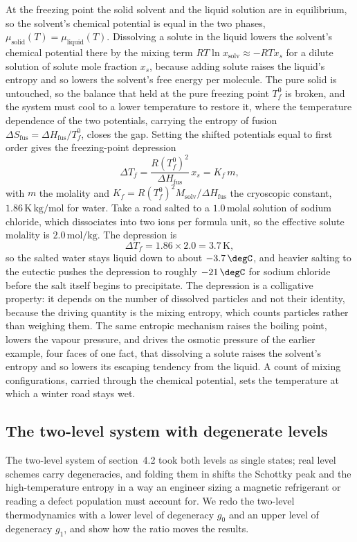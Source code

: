 At the freezing point the solid solvent and the liquid solution are in equilibrium,
so the solvent's chemical potential is equal in the two phases,
$\mu_{\text{solid}}(T) = \mu_{\text{liquid}}(T)$. Dissolving a solute in the liquid
lowers the solvent's chemical potential there by the mixing term $RT\ln x_{\text{solv}}
\approx -RT x_s$ for a dilute solution of solute mole fraction $x_s$, because adding
solute raises the liquid's entropy and so lowers the solvent's free energy per
molecule. The pure solid is untouched, so the balance that held at the pure freezing
point $T_f^0$ is broken, and the system must cool to a lower temperature to restore
it, where the temperature dependence of the two potentials, carrying the entropy of
fusion $\Delta S_{\text{fus}} = \Delta H_{\text{fus}}/T_f^0$, closes the gap.
Setting the shifted potentials equal to first order gives the freezing-point
depression
\[
\Delta T_f = \frac{R (T_f^0)^2}{\Delta H_{\text{fus}}}\,x_s
= K_f\, m,
\]
with $m$ the molality and $K_f = R(T_f^0)^2 M_{\text{solv}}/\Delta H_{\text{fus}}$
the cryoscopic constant, $1.86\,\si{\kelvin}\,\text{kg}/\text{mol}$ for water. Take
a road salted to a $1.0\,\text{molal}$ solution of sodium chloride, which
dissociates into two ions per formula unit, so the effective solute molality is
$2.0\,\text{mol}/\text{kg}$. The depression is
\[
\Delta T_f = 1.86 \times 2.0 = 3.7\,\si{\kelvin},
\]
so the salted water stays liquid down to about $-3.7\,\degC$, and heavier salting to
the eutectic pushes the depression to roughly $-21\,\degC$ for sodium chloride
before the salt itself begins to precipitate. The depression is a colligative
property: it depends on the number of dissolved particles and not their identity,
because the driving quantity is the mixing entropy, which counts particles rather
than weighing them. The same entropic mechanism raises the boiling point, lowers the
vapour pressure, and drives the osmotic pressure of the earlier example, four faces
of one fact, that dissolving a solute raises the solvent's entropy and so lowers its
escaping tendency from the liquid. A count of mixing configurations, carried through
the chemical potential, sets the temperature at which a winter road stays wet.

\subsection{The two-level system with degenerate levels}

The two-level system of section~4.2 took both levels as single states; real level
schemes carry degeneracies, and folding them in shifts the Schottky peak and the
high-temperature entropy in a way an engineer sizing a magnetic refrigerant or
reading a defect population must account for. We redo the two-level thermodynamics
with a lower level of degeneracy $g_0$ and an upper level of degeneracy $g_1$, and
show how the ratio moves the results.

